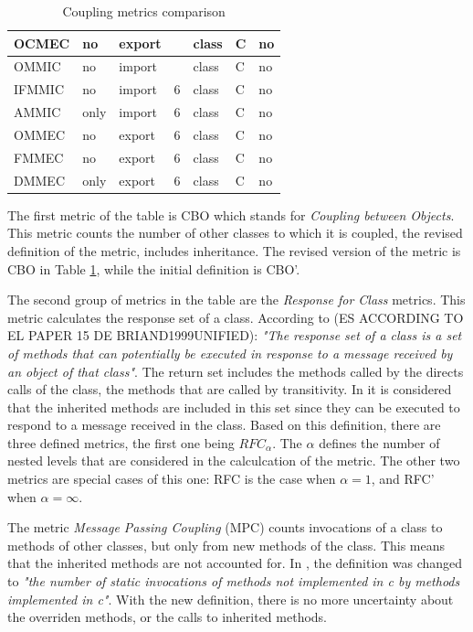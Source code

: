 \begin{table}[p]
\begin{center}
\begin{tabular}{|l|l|l|l|l|l|l|}
    OCMEC & no & export &  & class & C & no \\
    \hline
    OMMIC & no & import &  & class & C & no \\
    IFMMIC & no & import & 6 & class & C & no \\
    AMMIC & only & import & 6 & class & C & no \\
    OMMEC & no & export & 6 & class & C & no \\
    FMMEC & no & export & 6 & class & C & no \\
    DMMEC & only & export & 6 & class & C & no \\
    \hline
    \end{tabular}
    \end{center}
    \caption{Coupling metrics comparison}
    \label{table:coupling-metrics}
\end{table}

\bigskip\noindent
The first metric of the table is CBO which stands for \textit{Coupling between Objects}. This metric counts the number of other classes to which it is coupled, the revised definition of the metric, includes inheritance. The revised version of the metric is CBO in Table \ref{table:coupling-metrics}, while the initial definition is CBO'.

The second group of metrics in the table are the \textit{Response for Class} metrics. This metric calculates the response set of a class. According to \cn(ES ACCORDING TO EL PAPER 15 DE BRIAND1999UNIFIED): \textit{"The response set of a class is a set of methods that can potentially be executed in response to a message received by an object of that class"}. The return set includes the methods called by the directs calls of the class, the methods that are called by transitivity. In \cite{briand199unified} it is considered that the inherited methods are included in this set since they can be executed to respond to a message received in the class. Based on this definition, there are three defined metrics, the first one being $RFC_\alpha$. The $\alpha$ defines the number of nested levels that are considered in the calculcation of the metric. The other two metrics are special cases of this one: RFC is the case when $\alpha = 1$, and RFC' when $\alpha = \infty$.

The metric \textit{Message Passing Coupling} (MPC) counts invocations of a class to methods of other classes, but only from new methods of the class. This means that the inherited methods are not accounted for. In \cite{briand1999unified}, the definition was changed to \textit{"the number of static invocations of methods not implemented in c by methods implemented in c"}. With the new definition, there is no more uncertainty about the overriden methods, or the calls to inherited methods.

